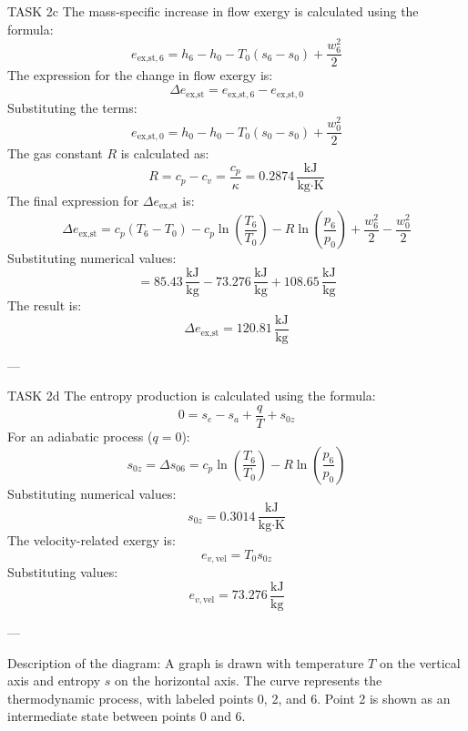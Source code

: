TASK 2c  
The mass-specific increase in flow exergy is calculated using the formula:  
\[
e_{\text{ex,st},6} = h_6 - h_0 - T_0 (s_6 - s_0) + \frac{w_6^2}{2}
\]  
The expression for the change in flow exergy is:  
\[
\Delta e_{\text{ex,st}} = e_{\text{ex,st},6} - e_{\text{ex,st},0}
\]  
Substituting the terms:  
\[
e_{\text{ex,st},0} = h_0 - h_0 - T_0 (s_0 - s_0) + \frac{w_0^2}{2}
\]  
The gas constant \( R \) is calculated as:  
\[
R = c_p - c_v = \frac{c_p}{\kappa} = 0.2874 \, \frac{\text{kJ}}{\text{kg·K}}
\]  
The final expression for \( \Delta e_{\text{ex,st}} \) is:  
\[
\Delta e_{\text{ex,st}} = c_p (T_6 - T_0) - c_p \ln \left( \frac{T_6}{T_0} \right) - R \ln \left( \frac{p_6}{p_0} \right) + \frac{w_6^2}{2} - \frac{w_0^2}{2}
\]  
Substituting numerical values:  
\[
= 85.43 \, \frac{\text{kJ}}{\text{kg}} - 73.276 \, \frac{\text{kJ}}{\text{kg}} + 108.65 \, \frac{\text{kJ}}{\text{kg}}
\]  
The result is:  
\[
\Delta e_{\text{ex,st}} = 120.81 \, \frac{\text{kJ}}{\text{kg}}
\]  

---

TASK 2d  
The entropy production is calculated using the formula:  
\[
0 = s_e - s_a + \frac{q}{T} + s_{0z}
\]  
For an adiabatic process (\( q = 0 \)):  
\[
s_{0z} = \Delta s_{06} = c_p \ln \left( \frac{T_6}{T_0} \right) - R \ln \left( \frac{p_6}{p_0} \right)
\]  
Substituting numerical values:  
\[
s_{0z} = 0.3014 \, \frac{\text{kJ}}{\text{kg·K}}
\]  
The velocity-related exergy is:  
\[
e_{v,\text{vel}} = T_0 s_{0z}
\]  
Substituting values:  
\[
e_{v,\text{vel}} = 73.276 \, \frac{\text{kJ}}{\text{kg}}
\]  

---

Description of the diagram:  
A graph is drawn with temperature \( T \) on the vertical axis and entropy \( s \) on the horizontal axis. The curve represents the thermodynamic process, with labeled points 0, 2, and 6. Point 2 is shown as an intermediate state between points 0 and 6.